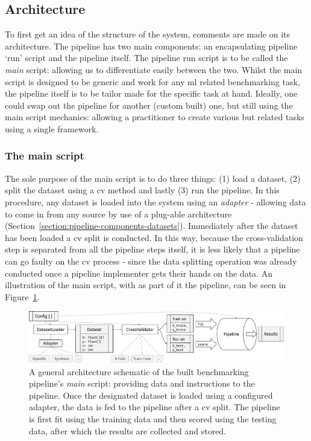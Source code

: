 \documentclass[../main.tex]{subfiles}
\begin{document}
\subsection{Architecture}
To first get an idea of the structure of the system, comments are made on its architecture. The pipeline has two main components: an encapsulating pipeline `run' script and the pipeline itself. The pipeline run script is to be called the \textit{main} script: allowing us to differentiate easily between the two. Whilst the main script is designed to be generic and work for any \gls{ml} related benchmarking task, the pipeline itself is to be tailor made for the specific task at hand. Ideally, one could swap out the pipeline for another (custom built) one, but still using the main script mechanics: allowing a practitioner to create various but related tasks using a single framework.



\subsubsection{The main script}\label{section:pipeline-main-script}
The sole purpose of the main script is to do three things: (1) load a dataset, (2) split the dataset using a \gls{cv} method and lastly (3) run the pipeline. In this procedure, any dataset is loaded into the system using an \textit{adapter} - allowing data to come in from any source by use of a plug-able architecture (Section~\ref{section:pipeline-components-datasets}). Immediately after the dataset has been loaded a \gls{cv} split is conducted. In this way, because the cross-validation step is separated from all the pipeline steps itself, it is less likely that a pipeline can go faulty on the \gls{cv} process - since the data splitting operation was already conducted once a pipeline implementer gets their hands on the data. An illustration of the main script, with as part of it the pipeline, can be seen in Figure~\ref{fig:schematic-main-architecture}.

\begin{figure}[ht]
    \centering
    \includegraphics[width=\linewidth]{report/images/schematic-main-architecture.pdf}
    \caption{A general architecture schematic of the built benchmarking pipeline's \textit{main} script: providing data and instructions to the pipeline. Once the designated dataset is loaded using a configured adapter, the data is fed to the pipeline after a \gls{cv} split. The pipeline is first fit using the training data and then scored using the testing data, after which the results are collected and stored.}
    \label{fig:schematic-main-architecture}
\end{figure}
\end{document}
